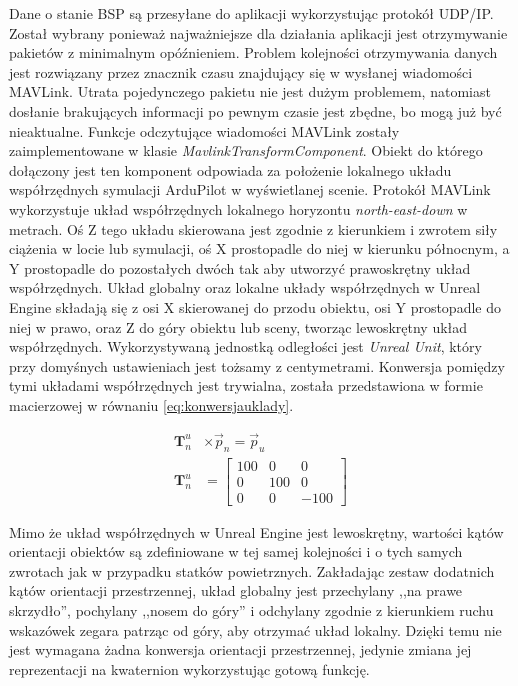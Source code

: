 Dane o stanie BSP są przesyłane do aplikacji wykorzystując protokół UDP/IP. Został wybrany ponieważ najważniejsze dla działania aplikacji jest otrzymywanie pakietów z minimalnym opóźnieniem. Problem kolejności otrzymywania danych jest rozwiązany przez znacznik czasu znajdujący się w wysłanej wiadomości MAVLink. Utrata pojedynczego pakietu nie jest dużym problemem, natomiast dosłanie brakujących informacji po pewnym czasie jest zbędne, bo mogą już być nieaktualne. Funkcje odczytujące wiadomości MAVLink zostały zaimplementowane w klasie \emph{MavlinkTransformComponent}. Obiekt do którego dołączony jest ten komponent odpowiada za położenie lokalnego układu współrzędnych symulacji ArduPilot w wyświetlanej scenie. Protokół MAVLink wykorzystuje układ współrzędnych lokalnego horyzontu \emph{north-east-down} w metrach. Oś Z tego układu skierowana jest zgodnie z kierunkiem i zwrotem siły ciążenia w locie lub symulacji, oś X prostopadle do niej w kierunku północnym, a Y prostopadle do pozostałych dwóch tak aby utworzyć prawoskrętny układ współrzędnych. Układ globalny oraz lokalne układy współrzędnych w Unreal Engine składają się z osi X skierowanej do przodu obiektu, osi Y prostopadle do niej w prawo, oraz Z do góry obiektu lub sceny, tworząc lewoskrętny układ współrzędnych. Wykorzystywaną jednostką odległości jest \emph{Unreal Unit}, który przy domyśnych ustawieniach jest tożsamy z centymetrami. Konwersja pomiędzy tymi układami współrzędnych jest trywialna, została przedstawiona w formie macierzowej w równaniu \ref{eq:konwersjauklady}.

\begin{align}
    \label{eq:konwersjauklady}
    \mathbf{T}_{n}^{u} & \times \vec{p}_{n} = \vec{p}_{u}
    \\
    \mathbf{T}_{n}^{u} & =
    \begin{bmatrix}
        100 & 0   & 0    \\
        0   & 100 & 0    \\
        0   & 0   & -100
    \end{bmatrix}
\end{align}

Mimo że układ współrzędnych w Unreal Engine jest lewoskrętny, wartości kątów orientacji obiektów są zdefiniowane w tej samej kolejności i o tych samych zwrotach jak w przypadku statków powietrznych. Zakładając zestaw dodatnich kątów orientacji przestrzennej, układ globalny jest przechylany ,,na prawe skrzydło'', pochylany ,,nosem do góry'' i odchylany zgodnie z kierunkiem ruchu wskazówek zegara patrząc od góry, aby otrzymać układ lokalny. Dzięki temu nie jest wymagana żadna konwersja orientacji przestrzennej, jedynie zmiana jej reprezentacji na kwaternion wykorzystując gotową funkcję.

